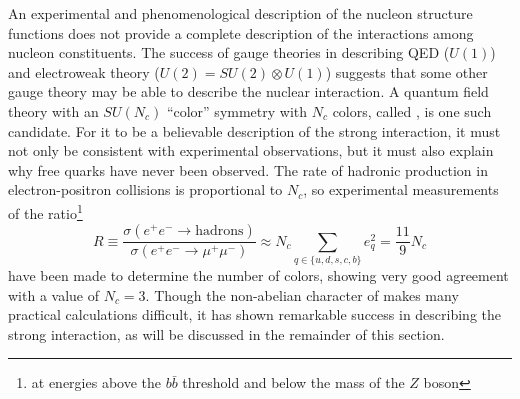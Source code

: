 An experimental and phenomenological description of the nucleon structure functions does not provide a complete description of the interactions among nucleon constituents.
The success of gauge theories in describing \ac{QED} ($U(1)$) and electroweak theory ($U(2) = SU(2) \otimes U(1)$) suggests that some other gauge theory may be able to describe the nuclear interaction.
A quantum field theory with an $SU(N_c)$ ``color'' symmetry with $N_c$ colors, called \qcd, is one such candidate.
For it to be a believable description of the strong interaction, it must not only be consistent with experimental observations, but it must also explain why free quarks have never been observed.
The rate of hadronic production in electron-positron collisions is proportional to $N_c$, so experimental measurements of the ratio\footnote{at energies above the $b\bar{b}$ threshold and below the mass of the $Z$ boson}
\begin{equation}
R \equiv \frac{\sigma\left(e^+ e^- \rightarrow \textrm{hadrons}\right)}{\sigma\left(e^+ e^- \rightarrow \mu^+ \mu^- \right)} \approx N_c \sum_{q \in \{u,d,s,c,b\}} e_q^2 = \frac{11}{9} N_c
\end{equation}
have been made to determine the number of colors, showing very good agreement with a value of $N_c = 3$.
Though the non-abelian character of \qcd makes many practical calculations difficult, it has shown remarkable success in describing the strong interaction, as will be discussed in the remainder of this section.

